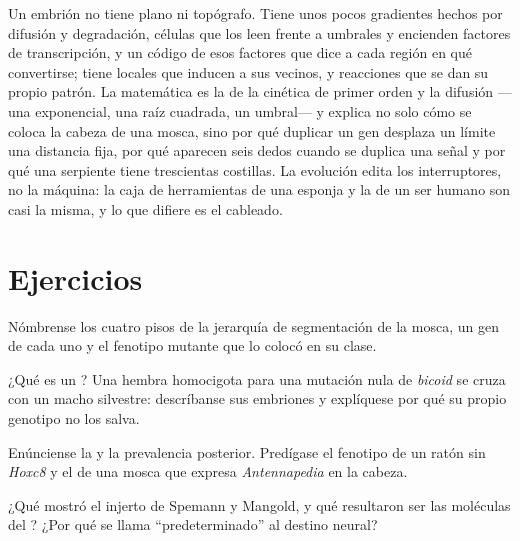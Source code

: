 \begin{remark}\label{rem:b3:developmental-genetics:remark}
Un embrión no tiene plano ni topógrafo. Tiene unos pocos gradientes
hechos por difusión y degradación, células que los leen frente a
umbrales y encienden factores de transcripción, y un código de esos
factores que dice a cada región en qué convertirse; tiene
 locales que inducen a sus vecinos, y reacciones que se
dan su propio patrón. La matemática es la de la cinética de primer
orden y la difusión ---una exponencial, una raíz cuadrada, un umbral---
y explica no solo cómo se coloca la cabeza de una mosca, sino por qué
duplicar un gen desplaza un límite una distancia fija, por qué aparecen
seis dedos cuando se duplica una señal y por qué una serpiente tiene
trescientas costillas. La evolución edita los interruptores, no la
máquina: la caja de herramientas de una esponja y la de un ser humano
son casi la misma, y lo que difiere es el cableado.
\end{remark}

\section{Ejercicios}

\begin{exercise}[$\star$]\label{exo:b3:developmental-genetics:1}
Nómbrense los cuatro pisos de la jerarquía de segmentación de la mosca,
un gen de cada uno y el fenotipo mutante que lo colocó en su clase.
\end{exercise}

\begin{exercise}[$\star$]\label{exo:b3:developmental-genetics:2}
¿Qué es un ? Una hembra homocigota para una
mutación nula de \emph{bicoid} se cruza con un macho silvestre:
descríbanse sus embriones y explíquese por qué su propio genotipo no
los salva.
\end{exercise}

\begin{exercise}[$\star$]\label{exo:b3:developmental-genetics:3}
Enúnciense la  y la prevalencia posterior. Predígase el
fenotipo de un ratón sin \emph{Hoxc8} y el de una mosca que expresa
\emph{Antennapedia} en la cabeza.
\end{exercise}

\begin{exercise}[$\star$]\label{exo:b3:developmental-genetics:4}
¿Qué mostró el injerto de Spemann y Mangold, y qué resultaron ser las
moléculas del ? ¿Por qué se llama ``predeterminado'' al
destino neural?
\end{exercise}

